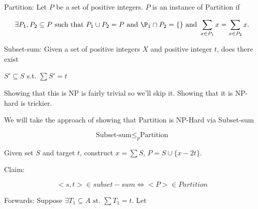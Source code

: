 \documentclass[../notes.tex]{subfiles}
\begin{document}
\begin{example}
Partition: Let $ P $ be a set of positive integers. $ P $ is an instance of Partition if 

\begin{equation}
	\exists P_1, P_2 \subseteq P \text{ such that } P_1 \cup P_2 = P \text{ and } \P_1 \cap P_2 = \{\} \text{ and }  \sum_{x \in P_1} x = \sum_{x \in P_2} x.
\end{equation}

Subset-sum: Given a set of positive integers $ X $ and positive integer $ t$, does there exist

$ S' \subseteq S $ s.t. $ \sum S' = t $



Showing that this is NP is fairly trivial so we'll skip it. Showing that it is NP-hard is trickier.

We will take the approach of showing that Partition is NP-Hard via Subset-sum


\begin{equation}
	\text{Subset-sum} \le_p \text{Partition}
\end{equation}

Given set $ S $ and target $ t $, construct $ x = \sum S $, $ P = S \cup \{x-2t\}  $.

Claim: 

\begin{equation}
	<s,t> \in subset-sum \Leftrightarrow <P> \in Partition
\end{equation}

Forwards: Suppose $ \exists T_1 \subseteq A \text{ st. } \sum T_1 = t $. Let $  $


	
\end{example}




\end{document}
